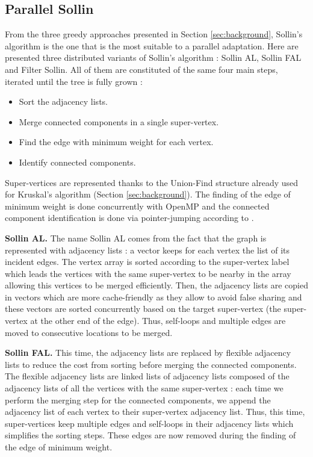 \documentclass[letterpaper]{article}
\newcommand{\mypar}[1]{{\bf #1.}}
\begin{document}
\subsection{Parallel Sollin} \label{sec:parSollin}

From the three greedy approaches presented in Section \ref{sec:background}, Sollin's algorithm is the one that is the most suitable to a parallel adaptation. Here are presented three distributed variants of Sollin's algorithm : Sollin AL, Sollin FAL and Filter Sollin. All of them are constituted of the same four main steps, iterated until the tree is fully grown :
\begin{itemize}
    \item Sort the adjacency lists.
    \item Merge connected components in a single super-vertex.
    \item Find the edge with minimum weight for each vertex.
    \item Identify connected components.
\end{itemize}

Super-vertices are represented thanks to the Union-Find structure already used for Kruskal's algorithm (Section \ref{sec:background}). The finding of the edge of minimum weight is done concurrently with OpenMP and the connected component identification is done via pointer-jumping according to \cite{pointerJump}.

\mypar{Sollin AL} The name Sollin AL comes from the fact that the graph is represented with adjacency lists : a vector keeps for each vertex the list of its incident edges. The vertex array is sorted according to the super-vertex label which leads the vertices with the same super-vertex to be nearby in the array allowing this vertices to be merged efficiently. Then, the adjacency lists are copied in vectors which are more cache-friendly as they allow to avoid false sharing \cite{cache} and these vectors are sorted concurrently based on the target super-vertex (the super-vertex at the other end of the edge).  Thus, self-loops and multiple edges are moved to consecutive locations to be merged.

\mypar{Sollin FAL} This time, the adjacency lists are replaced by flexible adjacency lists to reduce the cost from sorting before merging the connected components. The flexible adjacency lists are linked lists of adjacency lists composed of the adjacency lists of all the vertices with the same super-vertex : each time we perform the merging step for the connected components, we append the adjacency list of each vertex to their super-vertex adjacency list. Thus, this time, super-vertices keep multiple edges and self-loops in their adjacency lists which simplifies the sorting steps. These edges are now removed during the finding of the edge of minimum weight.
\end{document}
